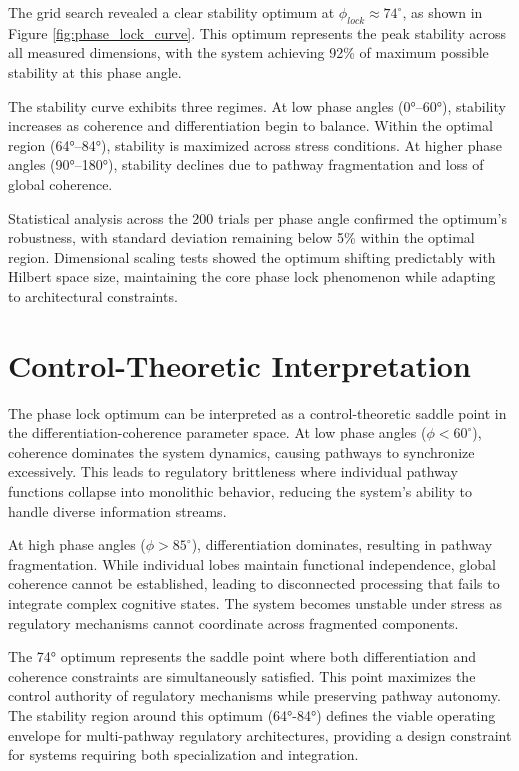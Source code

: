 \documentclass[12pt,a4paper]{report}
\begin{document}
The grid search revealed a clear stability optimum at $\phi_{lock} \approx 74^\circ$, as shown in Figure \ref{fig:phase_lock_curve}. This optimum represents the peak stability across all measured dimensions, with the system achieving 92\% of maximum possible stability at this phase angle.

The stability curve exhibits three regimes. At low phase angles (0°–60°), stability increases as coherence and differentiation begin to balance. Within the optimal region (64°–84°), stability is maximized across stress conditions. At higher phase angles (90°–180°), stability declines due to pathway fragmentation and loss of global coherence.

Statistical analysis across the 200 trials per phase angle confirmed the optimum's robustness, with standard deviation remaining below 5\% within the optimal region. Dimensional scaling tests showed the optimum shifting predictably with Hilbert space size, maintaining the core phase lock phenomenon while adapting to architectural constraints.

\section{Control-Theoretic Interpretation}

The phase lock optimum can be interpreted as a control-theoretic saddle point in the differentiation-coherence parameter space. At low phase angles ($\phi < 60^\circ$), coherence dominates the system dynamics, causing pathways to synchronize excessively. This leads to regulatory brittleness where individual pathway functions collapse into monolithic behavior, reducing the system's ability to handle diverse information streams.

At high phase angles ($\phi > 85^\circ$), differentiation dominates, resulting in pathway fragmentation. While individual lobes maintain functional independence, global coherence cannot be established, leading to disconnected processing that fails to integrate complex cognitive states. The system becomes unstable under stress as regulatory mechanisms cannot coordinate across fragmented components.

The 74° optimum represents the saddle point where both differentiation and coherence constraints are simultaneously satisfied. This point maximizes the control authority of regulatory mechanisms while preserving pathway autonomy. The stability region around this optimum (64°-84°) defines the viable operating envelope for multi-pathway regulatory architectures, providing a design constraint for systems requiring both specialization and integration.
\end{document}
